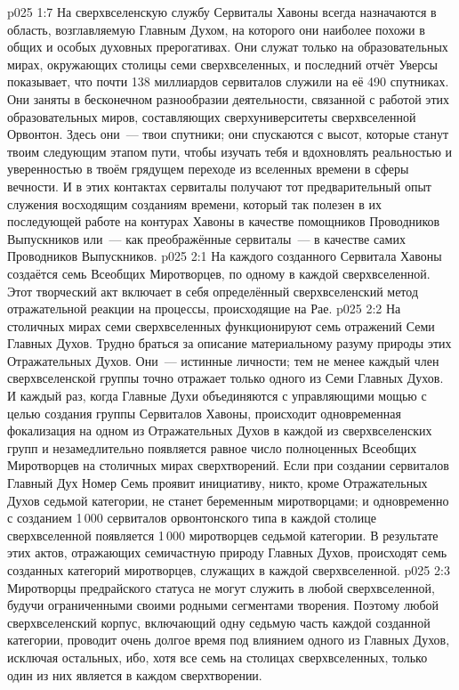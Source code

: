 \vs p025 1:7 На сверхвселенскую службу Сервиталы Хавоны всегда назначаются в область, возглавляемую Главным Духом, на которого они наиболее похожи в общих и особых духовных прерогативах. Они служат только на образовательных мирах, окружающих столицы семи сверхвселенных, и последний отчёт Уверсы показывает, что почти 138 миллиардов сервиталов служили на её 490 спутниках. Они заняты в бесконечном разнообразии деятельности, связанной с работой этих образовательных миров, составляющих сверхуниверситеты сверхвселенной Орвонтон. Здесь они~--- твои спутники; они спускаются с высот, которые станут твоим следующим этапом пути, чтобы изучать тебя и вдохновлять реальностью и уверенностью в твоём грядущем переходе из вселенных времени в сферы вечности. И в этих контактах сервиталы получают тот предварительный опыт служения восходящим созданиям времени, который так полезен в их последующей работе на контурах Хавоны в качестве помощников Проводников Выпускников или~--- как преображённые сервиталы~--- в качестве самих Проводников Выпускников.
\vs p025 2:1 На каждого созданного Сервитала Хавоны создаётся семь Всеобщих Миротворцев, по одному в каждой сверхвселенной. Этот творческий акт включает в себя определённый сверхвселенский метод отражательной реакции на процессы, происходящие на Рае.
\vs p025 2:2 На столичных мирах семи сверхвселенных функционируют семь отражений Семи Главных Духов. Трудно браться за описание материальному разуму природы этих Отражательных Духов. Они~--- истинные личности; тем не менее каждый член сверхвселенской группы точно отражает только одного из Семи Главных Духов. И каждый раз, когда Главные Духи объединяются с управляющими мощью с целью создания группы Сервиталов Хавоны, происходит одновременная фокализация на одном из Отражательных Духов в каждой из сверхвселенских групп и незамедлительно появляется равное число полноценных Всеобщих Миротворцев на столичных мирах сверхтворений. Если при создании сервиталов Главный Дух Номер Семь проявит инициативу, никто, кроме Отражательных Духов седьмой категории, не станет беременным миротворцами; и одновременно с созданием 1\,000 сервиталов орвонтонского типа в каждой столице сверхвселенной появляется 1\,000 миротворцев седьмой категории. В результате этих актов, отражающих семичастную природу Главных Духов, происходят семь созданных категорий миротворцев, служащих в каждой сверхвселенной.
\vs p025 2:3 Миротворцы предрайского статуса не могут служить в любой сверхвселенной, будучи ограниченными своими родными сегментами творения. Поэтому любой сверхвселенский корпус, включающий одну седьмую часть каждой созданной категории, проводит очень долгое время под влиянием одного из Главных Духов, исключая остальных, ибо, хотя все семь  на столицах сверхвселенных, только один из них является  в каждом сверхтворении.
